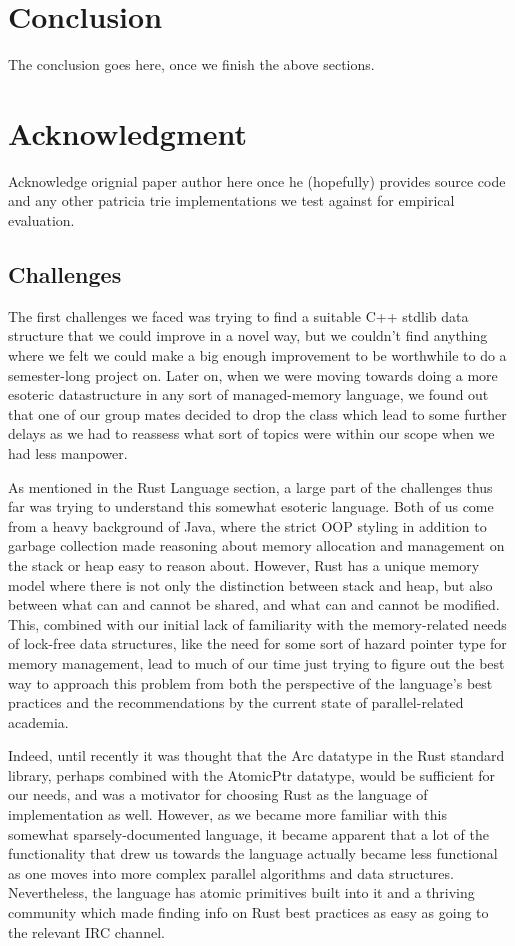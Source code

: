 \documentclass[conference]{IEEEtran}
\begin{document}
\section{Conclusion}
The conclusion goes here, once we finish the above sections.


\section{Acknowledgment}
Acknowledge orignial paper author here once he (hopefully) provides source code and any other patricia trie implementations we test against for empirical evaluation.


\appendix
\subsection{Challenges}
The first challenges we faced was trying to find a suitable C++ stdlib data structure that we could improve in a novel way, but we couldn't find anything where we felt we could make a big enough improvement to be worthwhile to do a semester-long project on. Later on, when we were moving towards doing a more esoteric datastructure in any sort of managed-memory language, we found out that one of our group mates decided to drop the class which lead to some further delays as we had to reassess what sort of topics were within our scope when we had less manpower.
\par
As mentioned in the Rust Language section, a large part of the challenges thus far was trying to understand this somewhat esoteric language. Both of us come from a heavy background of Java, where the strict OOP styling in addition to garbage collection made reasoning about memory allocation and management on the stack or heap easy to reason about. However, Rust has a unique memory model where there is not only the distinction between stack and heap, but also between what can and cannot be shared, and what can and cannot be modified. This, combined with our initial lack of familiarity with the memory-related needs of lock-free data structures, like the need for some sort of hazard pointer type for memory management, lead to much of our time just trying to figure out the best way to approach this problem from both the perspective of the language's best practices and the recommendations by the current state of parallel-related academia.
\par
Indeed, until recently it was thought that the Arc datatype in the Rust standard library, perhaps combined with the AtomicPtr datatype, would be sufficient for our needs, and was a motivator for choosing Rust as the language of implementation as well. However, as we became more familiar with this somewhat sparsely-documented language, it became apparent that a lot of the functionality that drew us towards the language actually became less functional as one moves into more complex parallel algorithms and data structures. Nevertheless, the language has atomic primitives built into it and a thriving community which made finding info on Rust best practices as easy as going to the relevant IRC channel.
\par
\end{document}
